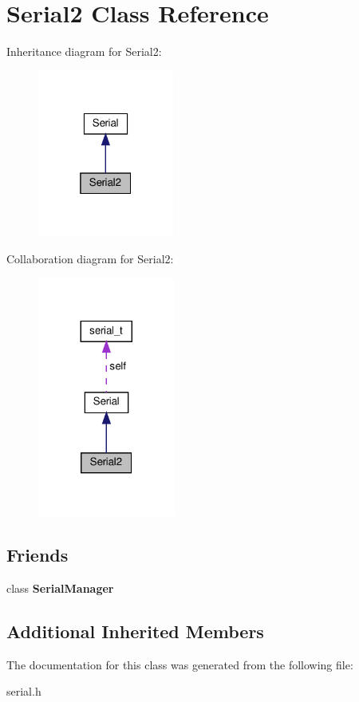 \hypertarget{classSerial2}{}\section{Serial2 Class Reference}
\label{classSerial2}


Inheritance diagram for Serial2\+:\nopagebreak
\begin{figure}[H]
\begin{center}
\leavevmode
\includegraphics[width=127pt]{classSerial2__inherit__graph}
\end{center}
\end{figure}


Collaboration diagram for Serial2\+:\nopagebreak
\begin{figure}[H]
\begin{center}
\leavevmode
\includegraphics[width=128pt]{classSerial2__coll__graph}
\end{center}
\end{figure}
\subsection*{Friends}
\begin{DoxyCompactItemize}
\item 
\mbox{\label{classSerial2_ae711712f6bc003a5d1156a409a19941b}} 
class {\bfseries Serial\+Manager}
\end{DoxyCompactItemize}
\subsection*{Additional Inherited Members}


The documentation for this class was generated from the following file\+:\begin{DoxyCompactItemize}
\item 
serial.\+h\end{DoxyCompactItemize}
